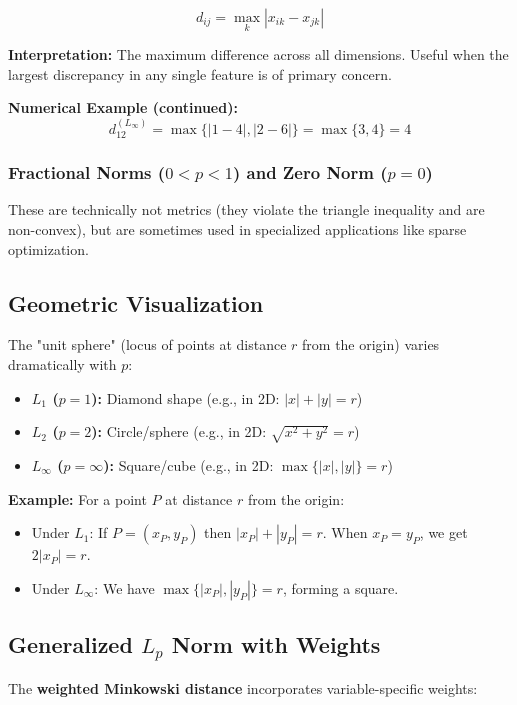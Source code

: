 \documentclass[11pt]{article}
\begin{document}
$$d_{ij} = \max_{k} |x_{ik} - x_{jk}|$$

\textbf{Interpretation:} The maximum difference across all dimensions. Useful when the largest discrepancy in any single feature is of primary concern.

\textbf{Numerical Example (continued):}
$$d_{12}^{(L_\infty)} = \max\{|1-4|, |2-6|\} = \max\{3, 4\} = 4$$

\subsubsection{Fractional Norms ($0 < p < 1$) and Zero Norm ($p = 0$)}

These are technically not metrics (they violate the triangle inequality and are non-convex), but are sometimes used in specialized applications like sparse optimization.

\subsection{Geometric Visualization}

The "unit sphere" (locus of points at distance $r$ from the origin) varies dramatically with $p$:

\begin{itemize}
    \item \textbf{$L_1$ ($p=1$):} Diamond shape (e.g., in 2D: $|x| + |y| = r$)
    \item \textbf{$L_2$ ($p=2$):} Circle/sphere (e.g., in 2D: $\sqrt{x^2 + y^2} = r$)
    \item \textbf{$L_\infty$ ($p=\infty$):} Square/cube (e.g., in 2D: $\max\{|x|, |y|\} = r$)
\end{itemize}

\textbf{Example:} For a point $P$ at distance $r$ from the origin:
\begin{itemize}
    \item Under $L_1$: If $P = (x_P, y_P)$ then $|x_P| + |y_P| = r$. When $x_P = y_P$, we get $2|x_P| = r$.
    \item Under $L_\infty$: We have $\max\{|x_P|, |y_P|\} = r$, forming a square.
\end{itemize}

\subsection{Generalized $L_p$ Norm with Weights}

The \textbf{weighted Minkowski distance} incorporates variable-specific weights:
\end{document}
